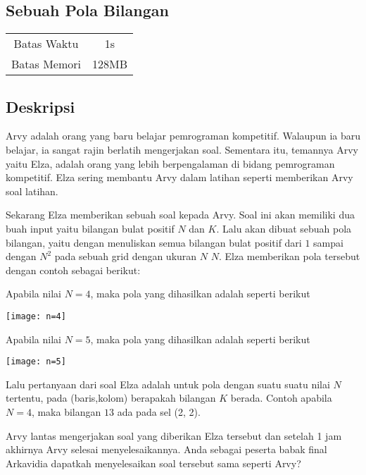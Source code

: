 \documentclass{article}
\begin{document}
\begin{center}
    \section*{Sebuah Pola Bilangan} %

    \begin{tabular}{ | c c | }
        \hline
        Batas Waktu  & 1s \\    %
        Batas Memori & 128MB \\  %
        \hline
    \end{tabular}
\end{center}

\subsection*{Deskripsi}

Arvy adalah orang yang baru belajar pemrograman kompetitif. Walaupun ia  baru belajar, ia sangat rajin berlatih
mengerjakan soal. Sementara itu, temannya Arvy yaitu Elza, adalah orang yang lebih berpengalaman di bidang pemrograman kompetitif. 
Elza sering membantu Arvy dalam latihan seperti memberikan Arvy soal latihan.

Sekarang Elza memberikan sebuah soal kepada Arvy. Soal ini akan memiliki dua buah input yaitu bilangan bulat positif $N$ dan $K$. 
Lalu akan dibuat sebuah pola bilangan, yaitu dengan menuliskan semua bilangan bulat positif dari $1$ sampai dengan $N^2$ pada sebuah 
grid dengan ukuran $N$ \times $N$. Elza memberikan pola tersebut dengan contoh sebagai berikut:

Apabila nilai $N = 4$, maka pola yang dihasilkan adalah seperti berikut
\begin{center}
    \texttt{[image: n=4]}
\end{center}

Apabila nilai $N = 5$, maka pola yang dihasilkan adalah seperti berikut
\begin{center}
    \texttt{[image: n=5]}
\end{center}

Lalu pertanyaan dari soal Elza adalah untuk pola dengan suatu suatu nilai $N$ tertentu, pada (baris,kolom) berapakah bilangan 
$K$ berada. Contoh apabila $N = 4$, maka bilangan $13$ ada pada sel (2, 2). 

Arvy lantas mengerjakan soal yang diberikan Elza tersebut dan setelah 1 jam akhirnya Arvy selesai menyelesaikannya.
Anda sebagai peserta babak final Arkavidia dapatkah menyelesaikan soal tersebut sama seperti Arvy?
\end{document}
